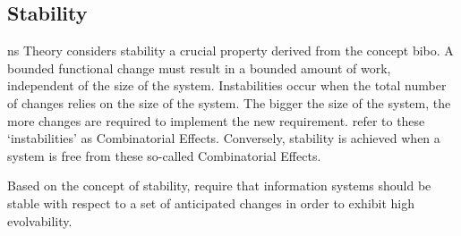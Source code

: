 \subsection{Stability} \label{subsec_on_stability}

\gls{ns} Theory considers stability a crucial property derived from the concept
\gls{bibo}. A bounded functional change must result in a bounded amount of work,
independent of the size of the system. Instabilities occur when the total number of
changes relies on the size of the system. The bigger the size of the system, the more
changes are required to implement the new requirement.
\textcite[271]{mannaert_normalized_2016} refer to these \enquote*{instabilities} as
Combinatorial Effects. Conversely, stability is achieved when a system is free from these
so-called Combinatorial Effects.

Based on the concept of stability, \textcite{mannaert_towards_2012} require that
information systems should be stable with respect to a set of anticipated changes in order
to exhibit high evolvability.